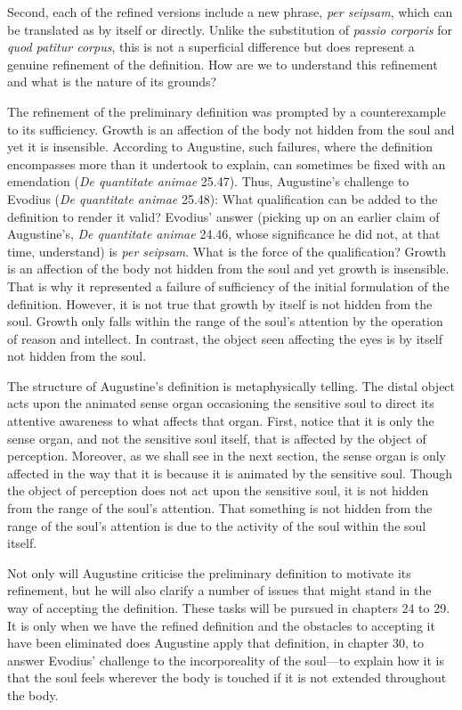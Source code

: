 \documentclass[12pt]{article}
\begin{document}
Second, each of the refined versions include a new phrase, \emph{per seipsam}, which can be translated as by itself or directly. Unlike the substitution of \emph{passio corporis} for \emph{quod patitur corpus}, this is not a superficial difference but does represent a genuine refinement of the definition. How are we to understand this refinement and what is the nature of its grounds?

The refinement of the preliminary definition was prompted by a counterexample to its sufficiency. Growth is an affection of the body not hidden from the soul and yet it is insensible. According to Augustine, such failures, where the definition encompasses more than it undertook to explain, can sometimes be fixed with an emendation (\emph{De quantitate animae} 25.47). Thus, Augustine's challenge to Evodius (\emph{De quantitate animae} 25.48): What qualification can be added to the definition to render it valid? Evodius' answer (picking up on an earlier claim of Augustine's, \emph{De quantitate animae} 24.46, whose significance he did not, at that time, understand) is \emph{per seipsam}. What is the force of the qualification? Growth is an affection of the body not hidden from the soul and yet growth is insensible. That is why it represented a failure of sufficiency of the initial formulation of the definition. However, it is not true that growth by itself is not hidden from the soul. Growth only falls within the range of the soul's attention by the operation of reason and intellect. In contrast, the object seen affecting the eyes is by itself not hidden from the soul.

The structure of Augustine's definition is metaphysically telling. The distal object acts upon the animated sense organ occasioning the sensitive soul to direct its attentive awareness to what affects that organ. First, notice that it is only the sense organ, and not the sensitive soul itself, that is affected by the object of perception. Moreover, as we shall see in the next section, the sense organ is only affected in the way that it is because it is animated by the sensitive soul. Though the object of perception does not act upon the sensitive soul, it is not hidden from the range of the soul's attention. That something is not hidden from the range of the soul’s attention is due to the activity of the soul within the soul itself.

Not only will Augustine criticise the preliminary definition to motivate its refinement, but he will also clarify a number of issues that might stand in the way of accepting the definition. These tasks will be pursued in chapters 24 to 29. It is only when we have the refined definition and the obstacles to accepting it have been eliminated does Augustine apply that definition, in chapter 30, to answer Evodius' challenge to the incorporeality of the soul---to explain how it is that the soul feels wherever the body is touched if it is not extended throughout the body.
\end{document}

